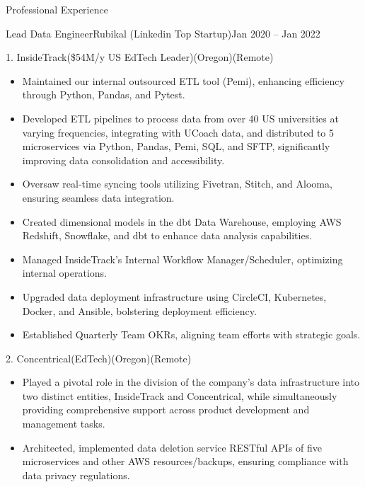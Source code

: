 \documentclass[]{ahmedamrcv}
\begin{document}
\begin{cvsection}{Professional Experience}
            \begin{cvsubsection}{Lead Data Engineer}{Rubikal (Linkedin Top Startup)}{Jan 2020 -- Jan 2022}
                \begin{cvsubsection}{1. InsideTrack}{(\$54M/y US EdTech Leader)}{(Oregon)(Remote)}
                    \begin{itemize}
    				\item Maintained our internal outsourced ETL tool (Pemi), enhancing efficiency through Python, Pandas, and Pytest.
                        \item Developed ETL pipelines to process data from over 40 US universities at varying frequencies, integrating with UCoach data, and distributed to 5 microservices via Python, Pandas, Pemi, SQL, and SFTP, significantly improving data consolidation and accessibility.
                        \item Oversaw real-time syncing tools utilizing Fivetran, Stitch, and Alooma, ensuring seamless data integration.
                        \item Created dimensional models in the dbt Data Warehouse, employing AWS Redshift, Snowflake, and dbt to enhance data analysis capabilities.
                        \item Managed InsideTrack’s Internal Workflow Manager/Scheduler, optimizing internal operations.
                        \item Upgraded data deployment infrastructure using CircleCI, Kubernetes, Docker, and Ansible, bolstering deployment efficiency.
                        \item Established Quarterly Team OKRs, aligning team efforts with strategic goals.
                    \end{itemize}
                \end{cvsubsection}
                
                \begin{cvsubsection}{2. Concentrical}{(EdTech)}{(Oregon)(Remote)}
    			\begin{itemize}
    				\item Played a pivotal role in the division of the company's data infrastructure into two distinct entities, InsideTrack and Concentrical, while simultaneously providing comprehensive support across product development and management tasks.
    				\item Architected, implemented data deletion service RESTful APIs of five microservices and other AWS resources/backups, ensuring compliance with data privacy regulations.
    			\end{itemize}
    		\end{cvsubsection}
            

\end{cvsubsection}
\end{cvsection}
\end{document}
